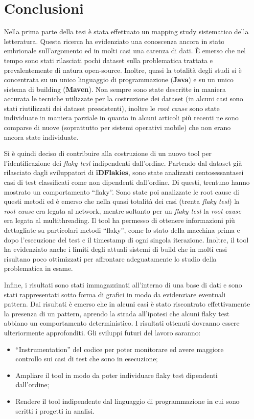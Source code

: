\chapter{Conclusioni}
Nella prima parte della tesi è stata effettuato un mapping study sistematico della letteratura. Questa ricerca ha evidenziato una conoscenza ancora in stato embrionale sull’argomento ed in molti casi una carenza di dati. È emerso che nel tempo sono stati rilasciati pochi dataset sulla problematica trattata e prevalentemente di natura open-source. Inoltre, quasi la totalità degli studi si è concentrata su un unico linguaggio di programmazione (\textbf{Java}) e su un unico sistema di building (\textbf{Maven}). Non sempre sono state descritte in maniera accurata le tecniche utilizzate per la costruzione dei dataset (in alcuni casi sono stati riutilizzati dei dataset preesistenti), inoltre le \emph{root cause} sono state individuate in maniera parziale in quanto in alcuni articoli più recenti ne sono comparse di nuove (soprattutto per sistemi operativi mobile) che non erano ancora state individuate.

Si è quindi deciso di contribuire alla costruzione di un nuovo tool per l’identificazione dei \emph{flaky test} indipendenti dall’ordine. Partendo dal dataset già rilasciato dagli sviluppatori di \textbf{iDFlakies}, sono state analizzati centosessantasei casi di test classificati come non dipendenti dall’ordine. Di questi, trentuno hanno mostrato un comportamento “flaky”. Sono state poi analizzate le root cause di questi metodi ed è emerso che nella quasi totalità dei casi (trenta \emph{flaky test}) la \emph{root cause} era legata al network, mentre soltanto per un \emph{flaky test} la \emph{root cause} era legata al multithreading. Il tool ha permesso di ottenere informazioni più dettagliate su particolari metodi “flaky”, come lo stato della macchina prima e dopo l’esecuzione del test e il timestamp di ogni singola iterazione. Inoltre, il tool ha evidenziato anche i limiti degli attuali sistemi di build che in molti casi risultano poco ottimizzati per affrontare adeguatamente lo studio della problematica in esame.

Infine, i risultati sono stati immagazzinati all’interno di una base di dati e sono
stati rappresentati sotto forma di grafici in modo da evidenziare eventuali pattern. Dai risultati è emerso che in alcuni casi è stato riscontrato effettivamente la presenza di un pattern, aprendo la strada all’ipotesi che alcuni flaky test abbiano un comportamento deterministico. I risultati ottenuti dovranno essere ulteriormente approfonditi.
Gli sviluppi futuri del lavoro saranno:
\begin{itemize}
\item “Instrumentation” del codice per poter monitorare ed avere maggiore controllo sui casi di test che sono in esecuzione;
\item Ampliare il tool in modo da poter individuare flaky test dipendenti dall’ordine;
\item Rendere il tool indipendente dal linguaggio di programmazione in cui sono scritti i progetti in analisi.
\end{itemize}